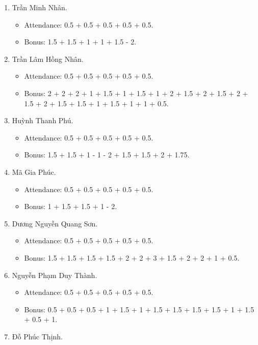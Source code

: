 \documentclass{article}
\begin{document}
\begin{enumerate}
\begin{itemize}
    \end{itemize}
    \item {\sc Trần Minh Nhân.}
    \begin{itemize}
        \item Attendance: 0.5 + 0.5 + 0.5 + 0.5 + 0.5.
        \item Bonus: 1.5 + 1.5 + 1 + 1 + 1.5 - 2.
    \end{itemize}
    \item {\sc Trần Lâm Hồng Nhân.}
    \begin{itemize}
        \item Attendance: 0.5 + 0.5 + 0.5 + 0.5 + 0.5.
        \item Bonus: 2 + 2 + 2 + 1 + 1.5 + 1 + 1.5 + 1 + 2 + 1.5 + 2 + 1.5 + 2 + 1.5 + 2 + 1.5 + 1.5 + 1 + 1.5 + 1 + 1 + 0.5.
    \end{itemize}
    \item {\sc Huỳnh Thanh Phú.}
    \begin{itemize}
        \item Attendance: 0.5 + 0.5 + 0.5 + 0.5 + 0.5.
        \item Bonus: 1.5 + 1.5 + 1 - 1 - 2 + 1.5 + 1.5 + 2 + 1.75.
    \end{itemize}
    \item {\sc Mã Gia Phúc.}
    \begin{itemize}
        \item Attendance: 0.5 + 0.5 + 0.5 + 0.5 + 0.5.
        \item Bonus: 1 + 1.5 + 1.5 + 1 - 2.
    \end{itemize}
    \item {\sc Dương Nguyễn Quang Sơn.}
    \begin{itemize}
        \item Attendance: 0.5 + 0.5 + 0.5 + 0.5 + 0.5.
        \item Bonus: 1.5 + 1.5 + 1.5 + 1.5 + 2 + 2 + 3 + 1.5 + 2 + 2 + 1 + 0.5.
    \end{itemize}
    \item {\sc Nguyễn Phạm Duy Thành.}
    \begin{itemize}
        \item Attendance: 0.5 + 0.5 + 0.5 + 0.5 + 0.5.
        \item Bonus: 0.5 + 0.5 + 0.5 + 1 + 1.5 + 1 + 1.5 + 1.5 + 1.5 + 1.5 + 1 + 1.5 + 0.5 + 1.
    \end{itemize}
    \item {\sc Đỗ Phúc Thịnh.}
    \begin{itemize}

\end{itemize}
\end{enumerate}
\end{document}
